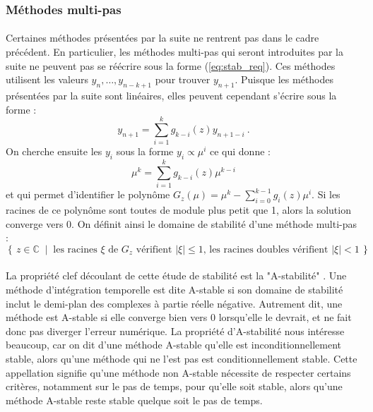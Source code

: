     \subsubsection{Méthodes multi-pas}

      \paragraph{}
      Certaines méthodes présentées par la suite ne rentrent pas dans le cadre précédent.
      En particulier, les méthodes multi-pas qui seront introduites par la suite ne peuvent pas se réécrire sous la forme (\ref{eq:stab_req}).
      Ces méthodes utilisent les valeurs $y_n, \dots, y_{n-k+1}$ pour trouver $y_{n+1}$.
      Puisque les méthodes présentées par la suite sont linéaires, elles peuvent cependant s'écrire sous la forme :
      \[y_{n+1} = \sum_{i=1}^kg_{k-i}\left(z\right)y_{n+1-i}\ .\]
      On cherche ensuite les $y_i$ sous la forme $y_i\propto\mu^{i}$ ce qui donne :
      \[\mu^k = \sum_{i=1}^kg_{k-i}\left(z\right)\mu^{k-i}\]
      et qui permet d'identifier le polynôme $G_z\left(\mu\right) = \mu^k - \sum_{i=0}^{k-1}g_i\left(z\right)\mu^i$.
      Si les racines de ce polynôme sont toutes de module plus petit que 1, alors la solution converge vers 0.
      On définit ainsi le domaine de stabilité d'une méthode multi-pas \cite{HairerWanner1996} :
      \[\left\{\,z\in\mathbb{C}\;\mid\;\textrm{les racines $\xi$ de $G_z$ vérifient $\left|\xi\right| \leq 1$, les racines doubles vérifient $\left|\xi\right| < 1$}\,\right\}\ .\]


    \paragraph{}
    La propriété clef découlant de cette étude de stabilité est la "A-stabilité" \cite{Dahlquist1963}.
    Une méthode d'intégration temporelle est dite A-stable si son domaine de stabilité inclut le demi-plan des complexes à partie réelle négative.
    Autrement dit, une méthode est A-stable si elle converge bien vers 0 lorsqu'elle le devrait, et ne fait donc pas diverger l'erreur numérique.
    La propriété d'A-stabilité nous intéresse beaucoup, car on dit d'une méthode A-stable qu'elle est inconditionnellement stable, alors qu'une méthode qui ne l'est pas est conditionnellement stable.
    Cette appellation signifie qu'une méthode non A-stable nécessite de respecter certains critères, notamment sur le pas de temps, pour qu'elle soit stable, alors qu'une méthode A-stable reste stable quelque soit le pas de temps.


